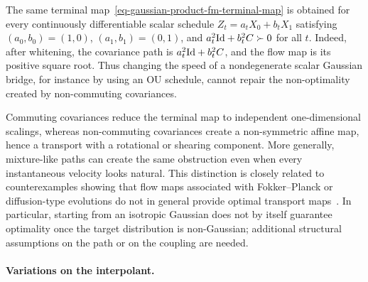 \begin{rem}
	The same terminal map~\eqref{eq-gaussian-product-fm-terminal-map} is obtained for every continuously differentiable scalar schedule $Z_t=a_tX_0+b_tX_1$ satisfying $(a_0,b_0)=(1,0)$, $(a_1,b_1)=(0,1)$, and $a_t^2\mathrm{Id}+b_t^2C\succ0$ for all $t$. Indeed, after whitening, the covariance path is $a_t^2\mathrm{Id}+b_t^2C$, and the flow map is its positive square root. Thus changing the speed of a nondegenerate scalar Gaussian bridge, for instance by using an OU schedule, cannot repair the non-optimality created by non-commuting covariances.

	Commuting covariances reduce the terminal map to independent one-dimensional scalings, whereas non-commuting covariances create a non-symmetric affine map, hence a transport with a rotational or shearing component. More generally, mixture-like paths can create the same obstruction even when every instantaneous velocity looks natural. This distinction is closely related to counterexamples showing that flow maps associated with Fokker--Planck or diffusion-type evolutions do not in general provide optimal transport maps~\cite{LavenantSantambrogio2022FlowMap}. In particular, starting from an isotropic Gaussian does not by itself guarantee optimality once the target distribution is non-Gaussian; additional structural assumptions on the path or on the coupling are needed.
\end{rem}

\paragraph{Variations on the interpolant.}

